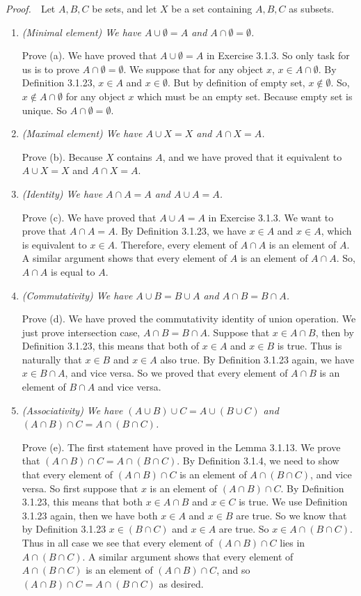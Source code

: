 \documentclass{book}
\newcommand{\pff}{\vspace{.25em}\noindent\emph{Proof.}~~}
\newcounter{Exercise}[section]
\begin{document}
\pff Let $A,B,C$ be sets, and let $X$ be a set containing $A,B,C$ as subsets.
\begin{enumerate}
    \item \emph{(Minimal element) We have $A\cup\emptyset=A$ and $A\cap\emptyset=\emptyset$.}

    Prove (a). We have proved that $A\cup\emptyset=A$ in Exercise 3.1.3. So only task for us is to prove $A\cap\emptyset=\emptyset$. We suppose that for any object $x$, $x\in A\cap\emptyset$. By Definition 3.1.23, $x\in A$ and $x\in\emptyset$. But by definition of empty set, $x\notin\emptyset$. So, $x\notin A\cap\emptyset$ for any object $x$ which must be an empty set. Because empty set is unique. So $A\cap\emptyset=\emptyset$.

    \item \emph{(Maximal element) We have $A\cup X=X$ and $A\cap X=A$.}

    Prove (b). Because $X$ contains $A$, and we have proved that it equivalent to $A\cup X=X$ and $A\cap X=A$.

    \item \emph{(Identity) We have $A\cap A=A$ and $A\cup A=A$.}

    Prove (c). We have proved that $A\cup A=A$ in Exercise 3.1.3. We want to prove that $A\cap A=A$. By Definition 3.1.23, we have $x\in A$ and $x\in A$, which is equivalent to $x\in A$. Therefore, every element of $A\cap A$ is an element of $A$. A similar argument shows that every element of $A$ is an element of $A\cap A$. So, $A\cap A$ is equal to $A$.

    \item \emph{(Commutativity) We have $A\cup B=B\cup A$ and $A\cap B=B\cap A$.}

    Prove (d). We have proved the commutativity identity of union operation. We just prove intersection case, $A\cap B=B\cap A$. Suppose that $x\in A\cap B$, then by Definition 3.1.23, this means that both of $x\in A$ and $x\in B$ is true. Thus is naturally that $x\in B$ and $x\in A$ also true. By Definition 3.1.23 again, we have $x\in B\cap A$, and vice versa. So we proved that every element of $A\cap B$ is an element of $B\cap A$ and vice versa.

    \item \emph{(Associativity) We have $(A\cup B)\cup C=A\cup(B\cup C)$ and $(A\cap B)\cap C=A\cap(B\cap C)$.}

    Prove (e). The first statement have proved in the Lemma 3.1.13. We prove that $(A\cap B)\cap C=A\cap(B\cap C)$. By Definition 3.1.4, we need to show that every element of $(A\cap B)\cap C$ is an element of $A\cap(B\cap C)$, and vice versa. So first suppose that $x$ is an element of $(A\cap B)\cap C$. By Definition 3.1.23, this means that both $x\in A\cap B$ and $x\in C$ is true. We use Definition 3.1.23 again, then we have both $x\in A$ and $x\in B$ are true. So we know that by Definition 3.1.23 $x\in (B\cap C)$ and $x\in A$ are true. So $x\in A\cap(B\cap C)$. Thus in all case we see that every element of $(A\cap B)\cap C$ lies in $A\cap(B\cap C)$. A similar argument shows that every element of $A\cap(B\cap C)$ is an element of $(A\cap B)\cap C$, and so $(A\cap B)\cap C=A\cap(B\cap C)$ as desired.


\end{enumerate}
\end{document}
